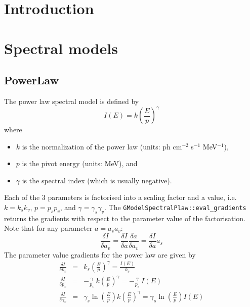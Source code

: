 \documentclass{article}[12pt,a4]
\begin{document}
\frontpage


\section{Introduction}


\section{Spectral models}

\subsection{PowerLaw}

The power law spectral model is defined by
\begin{equation}
I(E) = k \left( \frac{E}{p} \right)^{\gamma}
\end{equation}
where
\begin{itemize}
\item $k$ is the normalization of the power law (units: ph cm$^{-2}$ s$^{-1}$ MeV$^{-1}$),
\item $p$ is the pivot energy (units: MeV), and
\item $\gamma$ is the spectral index (which is usually negative).
\end{itemize}

Each of the 3 parameters is factorised into a scaling factor and a value, i.e.
$k=k_s k_v$, $p=p_s p_v$, and $\gamma = \gamma_s \gamma_v$.
The {\tt GModelSpectralPlaw::eval\_gradients} returns the gradients with
respect to the parameter value of the factorisation.
Note that for any parameter $a=a_s a_v$:
\begin{equation}
\frac{\delta I}{\delta a_v} = \frac{\delta I}{\delta a} \frac{\delta a}{\delta a_v} =
  \frac{\delta I}{\delta a} a_s
\end{equation}
The parameter value gradients for the power law are given by
\begin{eqnarray}
\frac{\delta I}{\delta k_v} & = & 
  k_s \left( \frac{E}{p} \right)^{\gamma} = \frac{I(E)}{k_v} \\
\frac{\delta I}{\delta p_v} & = & 
  -\frac{\gamma}{p_v} \, k \left( \frac{E}{p} \right)^{\gamma} =
  -\frac{\gamma}{p_v} \, I(E) \\
\frac{\delta I}{\delta \gamma_v} & = &
  \gamma_s \ln \left( \frac{E}{p} \right) k \left( \frac{E}{p} \right)^{\gamma} =
  \gamma_s \ln \left( \frac{E}{p} \right) I(E)
\end{eqnarray}
\end{document}
